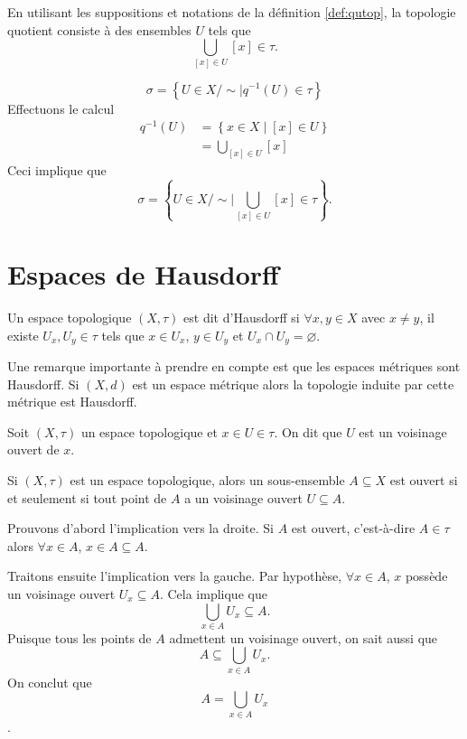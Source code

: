 \documentclass[french]{article}
\begin{document}
\begin{lemme}
  En utilisant les suppositions et notations de la définition \ref{def:qutop}, la topologie quotient consiste à des ensembles $U$ tels que
  $$\bigcup_{[x] \in U} [x] \in \tau.$$

  \tcblower
  \begin{preuve}
    $$\sigma = \left\{ U \in X/\sim \mid q^{-1}(U) \in \tau \right\}$$ 
    Effectuons le calcul
     \begin{align*}
       q^{-1}(U) &= \left\{ x \in X \mid [x] \in U \right\} \\
                 &= \bigcup_{[x] \in U} [x]
    \end{align*}
    Ceci implique que
    $$\sigma = \left\{ U \in X/\sim \mid \bigcup_{[x] \in U} [x] \in \tau \right\}.$$
  \end{preuve}
\end{lemme}

\section{Espaces de Hausdorff}
\begin{definition}
  Un espace topologique $(X, \tau)$ est dit d'Hausdorff si $\forall x, y \in X$ avec $x \not = y$, il existe  $U_x, U_y \in \tau$ tels que $x \in U_x$, $y \in U_y$ et $U_x \cap U_y = \varnothing$.
\end{definition}
Une remarque importante à prendre en compte est que les espaces métriques sont Hausdorff. Si $(X, d)$ est un espace métrique alors la topologie induite par cette métrique est Hausdorff.
\begin{definition}
  Soit $(X, \tau)$ un espace topologique et $x \in U \in \tau$. On dit que $U$ est un voisinage ouvert de $x$. 
\end{definition}

\begin{lemme}\label{lem:ouv}
  Si $(X, \tau)$ est un espace topologique, alors un sous-ensemble $A \subseteq X$ est ouvert si et seulement si tout point de $A$ a un voisinage ouvert $U \subseteq A$.

  \tcblower
  \begin{preuve}
    Prouvons d'abord l'implication vers la droite. Si $A$ est ouvert, c'est-à-dire $A \in \tau$ alors $\forall x \in A$, $x \in A \subseteq A$.
    \par Traitons ensuite l'implication vers la gauche. Par hypothèse, $\forall x \in A$, $x$ possède un voisinage ouvert $U_x \subseteq A$. Cela implique que
    $$\bigcup_{x\in A} U_x \subseteq A.$$
    Puisque tous les points de $A$ admettent un voisinage ouvert, on sait aussi que
    $$A \subseteq \bigcup_{x \in A} U_x.$$
    On conclut que $$A = \bigcup_{x \in A} U_x$$.
  \end{preuve}
\end{lemme}
\end{document}
